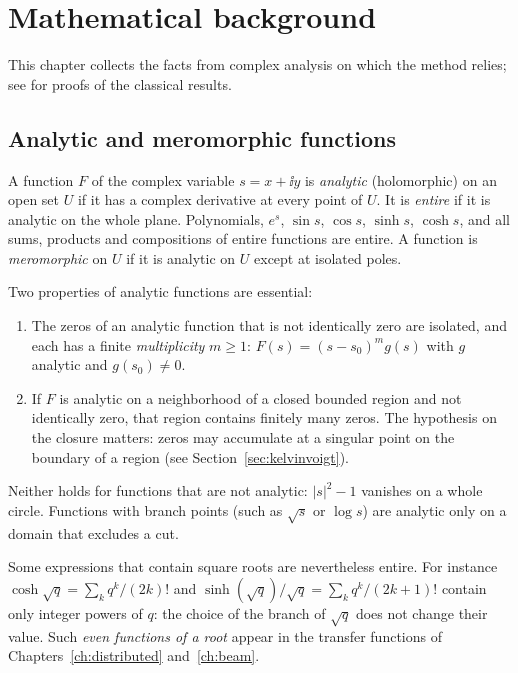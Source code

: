\chapter{Mathematical background}\label{ch:background}

This chapter collects the facts from complex analysis on which the method
relies; see \citet{ahlfors1979} for proofs of the classical results.

\section{Analytic and meromorphic functions}

A function $F$ of the complex variable $s=x+\ii y$ is \emph{analytic}
(holomorphic) on an open set $U$ if it has a complex derivative at every
point of $U$. It is \emph{entire} if it is analytic on the whole plane.
Polynomials, $e^{s}$, $\sin s$, $\cos s$, $\sinh s$, $\cosh s$, and all sums,
products and compositions of entire functions are entire. A function is
\emph{meromorphic} on $U$ if it is analytic on $U$ except at isolated poles.

Two properties of analytic functions are essential:
\begin{enumerate}
  \item The zeros of an analytic function that is not identically zero are
        isolated, and each has a finite \emph{multiplicity} $m\ge1$:
        $F(s)=(s-s_0)^m g(s)$ with $g$ analytic and $g(s_0)\neq0$.
  \item If $F$ is analytic on a neighborhood of a closed bounded region
        and not identically zero, that region contains finitely many
        zeros. The hypothesis on the closure matters: zeros may accumulate
        at a singular point on the boundary of a region (see
        Section~\ref{sec:kelvinvoigt}).
\end{enumerate}
Neither holds for functions that are not analytic: $|s|^2-1$ vanishes on a
whole circle. Functions with branch points (such as $\sqrt s$ or $\log s$)
are analytic only on a domain that excludes a cut.

Some expressions that contain square roots are nevertheless entire. For
instance $\cosh\sqrt q=\sum_k q^k/(2k)!$ and $\sinh(\sqrt q)/\sqrt q=
\sum_k q^k/(2k+1)!$ contain only integer powers of $q$: the choice of the
branch of $\sqrt q$ does not change their value. Such \emph{even functions of
a root} appear in the transfer functions of Chapters~\ref{ch:distributed}
and~\ref{ch:beam}.

